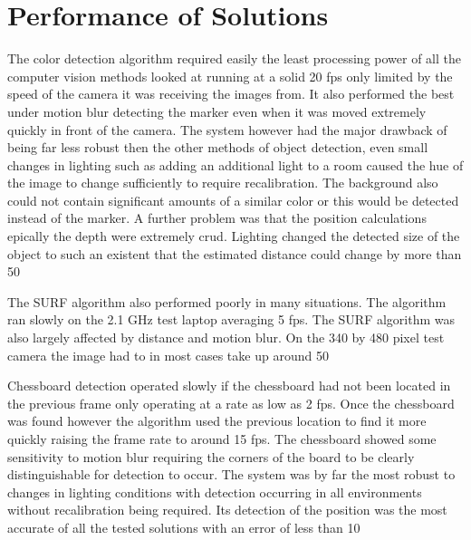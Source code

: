 \section{Performance of Solutions}
The color detection algorithm required easily the least processing power of all the computer vision methods looked at running at a solid 20 fps only limited by the speed of the camera it was receiving the images from. It also performed the best under motion blur  detecting the marker even when it was moved extremely quickly in front of the camera. The system however had the major drawback of being far less robust then the other methods of object detection, even small changes in lighting such as adding an additional light to a room caused the hue of the image to change sufficiently to require recalibration. The background also could not contain significant amounts of a similar color or this would be detected instead of the marker. A further problem was that the position calculations epically the depth were extremely crud. Lighting changed the detected size of the object to such an existent that the estimated distance could change by more than 50%

The SURF algorithm also performed poorly in many situations. The algorithm ran slowly on the 2.1 GHz test laptop averaging 5 fps. The SURF algorithm was also largely affected by distance and motion blur. On the 340 by 480 pixel test camera the image had to in most cases take up around 50%

Chessboard detection operated slowly if the chessboard had not been located in the previous frame only operating at a rate as low as 2 fps. Once the chessboard was found however the algorithm used the previous location to find it more quickly raising the frame rate to around 15 fps. The chessboard showed some sensitivity to motion blur requiring the corners of the board to be clearly distinguishable for detection to occur. The system was by far the most robust to changes in lighting conditions with detection occurring in all environments without recalibration being required. Its detection of the position was the most accurate of all the tested solutions with an error of less than 10 %